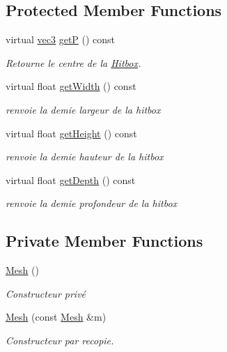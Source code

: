 \subsection*{Protected Member Functions}
\begin{DoxyCompactItemize}
\item 
virtual \hyperlink{structvec3}{vec3} \hyperlink{class_mesh_ab1da4db267719d533521873715b9359c}{get\+P} () const 
\begin{DoxyCompactList}\small\item\em Retourne le centre de la \hyperlink{class_hitbox}{Hitbox}. \end{DoxyCompactList}\item 
virtual float \hyperlink{class_mesh_a8e0ae90ffac8c8295027d21f5af155cc}{get\+Width} () const 
\begin{DoxyCompactList}\small\item\em renvoie la demie largeur de la hitbox \end{DoxyCompactList}\item 
virtual float \hyperlink{class_mesh_a3feeb4d65973f3dc0c0e66ae95b36971}{get\+Height} () const 
\begin{DoxyCompactList}\small\item\em renvoie la demie hauteur de la hitbox \end{DoxyCompactList}\item 
virtual float \hyperlink{class_mesh_a505f44a95b363e12f6434801fe697108}{get\+Depth} () const 
\begin{DoxyCompactList}\small\item\em renvoie la demie profondeur de la hitbox \end{DoxyCompactList}\end{DoxyCompactItemize}
\subsection*{Private Member Functions}
\begin{DoxyCompactItemize}
\item 
\hyperlink{class_mesh_a2af137f1571af89172b9c102302c416b}{Mesh} ()
\begin{DoxyCompactList}\small\item\em Constructeur privé \end{DoxyCompactList}\item 
\hyperlink{class_mesh_a713cb62e7078cfd627108a0b14f72c6f}{Mesh} (const \hyperlink{class_mesh}{Mesh} \&m)
\begin{DoxyCompactList}\small\item\em Constructeur par recopie. \end{DoxyCompactList}\end{DoxyCompactItemize}
